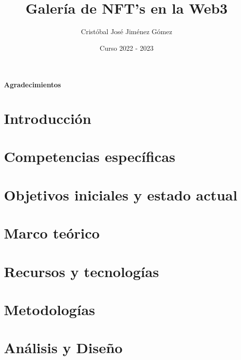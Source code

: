 \documentclass[oneside,12pt]{book}
\title{Galería de NFT's en la Web3}
\author{Cristóbal José Jiménez Gómez}
\date{Curso 2022 - 2023}
\begin{document}


%

\newpage
{}
{\Large{\textbf{Agradecimientos}}}


\clearpage

\tableofcontents
\newpage
\listoffigures
\newpage
\listoftables

\clearpage
{}

\chapter{Introducción}

\newpage
\chapter{Competencias específicas}

\newpage
\chapter{Objetivos iniciales y estado actual}

\newpage
\begin{comment}
        CAPÍTULO OBLIGATORIO
        Metodología aplicada y desarrollo del trabajo en sus distintas fases, decisiones de diseño, herramientas empleadas.
        Si el trabajo incluye software desarrollado, deberán seleccionarse las secciones más relevantes del mismo y comentarlas en la memoria.
        Ajuste a la planificación inicialmente prevista.
        Modificación en los objetivos planteados.
\end{comment}
\chapter{Marco teórico}
\newpage
\chapter{Recursos y tecnologías}
\newpage
\chapter{Metodologías}
\newpage
\chapter{Análisis y Diseño}
\newpage
\end{document}

